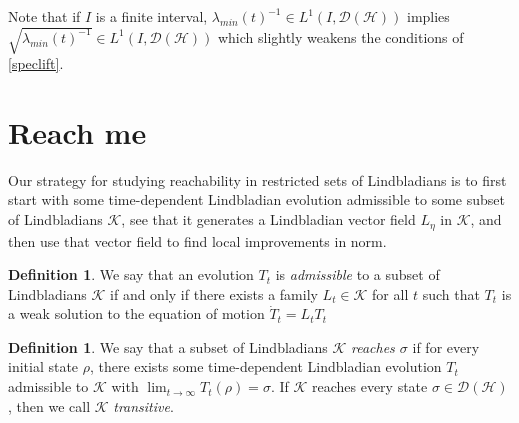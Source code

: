 \documentclass[11pt,reqno]{amsart}
\theoremstyle{definition}
\newtheorem{definition}[theorem]{Definition}
\newcommand{\mc}{\mathcal}
\begin{document}
Note that if $I$ is a finite interval, $\lambda_{min}(t)^{-1} \in L^1(I, \mc D(\mc H))$ implies $\sqrt{\lambda_{min}(t)^{-1}} \in L^1(I, \mc D(\mc H))$ which slightly weakens the conditions of \cref{speclift}.


\section{Reach me}\label{reach}
Our strategy for studying reachability in restricted sets of Lindbladians is to first start with some time-dependent Lindbladian evolution admissible to some subset of Lindbladians $\mc K$, see that it generates a Lindbladian vector field $L_\eta$ in $\mc K$, and then use that vector field to find local improvements in norm. 

\begin{definition}
We say that an evolution $T_t$ is \emph{admissible} to a subset of Lindbladians $\mc K$ if and only if there exists a family $L_t \in \mc K$ for all $t$ such that $T_t$ is a weak solution to the equation of motion $\dot T_t = L_t T_t$
\end{definition}

\begin{definition}
    We say that a subset of Lindbladians $\mc K$ \emph{reaches $\sigma$} if for every initial state $\rho$, there exists some time-dependent Lindbladian evolution $T_t$ admissible to $\mc K$ with $\lim_{t \to \infty} T_t(\rho) = \sigma$. If $\mc K$ reaches every state $\sigma \in \mc D(\mc{H})$, then we call $\mc K$ \emph{transitive}.
\end{definition}
\end{document}
